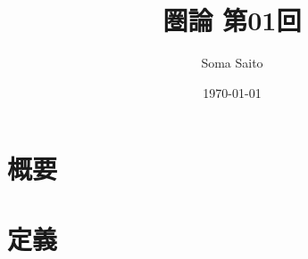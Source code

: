 \documentclass[unicode,12pt,report]{ltjsarticle}
\title{圏論 第01回}
\author{Soma Saito}
\date{\today}
\begin{document}
\maketitle

\section{概要}

\section{定義}

\end{document}
